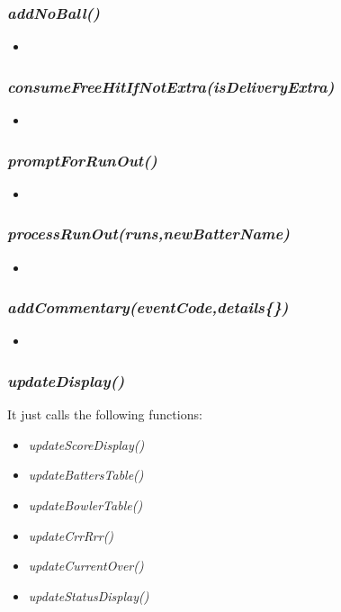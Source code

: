 \documentclass[a4paper,12pt]{article}
\begin{document}
\subsubsection{\textit{addNoBall()}}
\begin{itemize}
\item 
\end{itemize}

\subsubsection{\textit{consumeFreeHitIfNotExtra(isDeliveryExtra)}}
\begin{itemize}
\item 
\end{itemize}

\subsubsection{\textit{promptForRunOut()}}
\begin{itemize}
\item 
\end{itemize}

\subsubsection{\textit{processRunOut(runs,newBatterName)}}
\begin{itemize}
\item 
\end{itemize}

\subsubsection{\textit{addCommentary(eventCode,details\{\})}}
\begin{itemize}
\item 
\end{itemize}


\subsubsection{\textit{updateDisplay()}}
It just calls the following functions:
\begin{itemize}
\item \textit{updateScoreDisplay()} 
\item \textit{updateBattersTable()}
\item \textit{updateBowlerTable()}
\item \textit{updateCrrRrr()}
\item \textit{updateCurrentOver()}
\item \textit{updateStatusDisplay()}
\end{itemize}
\end{document}
